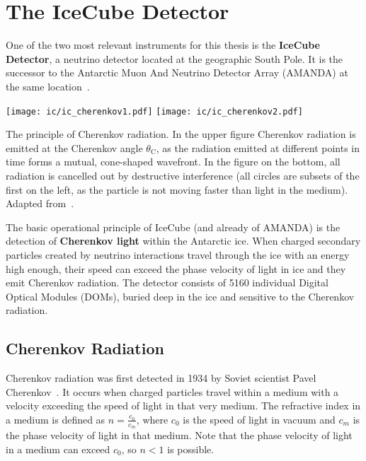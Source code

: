 \chapter{The IceCube Detector}\label{ic}
One of the two most relevant instruments for this thesis is the \textbf{IceCube Detector}, a neutrino detector located at the geographic South Pole. It is the successor to the Antarctic Muon And Neutrino Detector Array (AMANDA) at the same location~.
\begin{marginfigure}
    \texttt{[image: ic/ic\_cherenkov1.pdf]}
    \texttt{[image: ic/ic\_cherenkov2.pdf]}
    \caption[Cherenkov radiation]{The principle of Cherenkov radiation. In the upper figure Cherenkov radiation is emitted at the Cherenkov angle $\theta_\text{C}$, as the radiation emitted at different points in time forms a mutual, cone-shaped wavefront. In the figure on the bottom, all radiation is cancelled out by destructive interference (all circles are subsets of the first on the left, as the particle is not moving faster than light in the medium). Adapted from~\cite{LAnnunziata2020}.}
\end{marginfigure}
The basic operational principle of IceCube (and already of AMANDA) is the detection of \textbf{Cherenkov light} within the Antarctic ice. When charged secondary particles created by neutrino interactions travel through the ice with an energy high enough, their speed can exceed the phase velocity of light in ice and they emit Cherenkov radiation. The detector consists of 5160 individual Digital Optical Modules (DOMs), buried deep in the ice and sensitive to the Cherenkov radiation.

\section{Cherenkov Radiation}\label{cherenkov_radiation}

Cherenkov radiation was first detected in 1934 by Soviet scientist Pavel Cherenkov~. It occurs when charged particles travel within a medium with a velocity exceeding the speed of light in that very medium. The refractive index in a medium is defined as $n=\frac{c_0}{c_m}$, where $c_0$ is the speed of light in vacuum and $c_m$ is the phase velocity of light in that medium. Note that the phase velocity of light in a medium can exceed $c_0$, so $n<1$ is possible.


